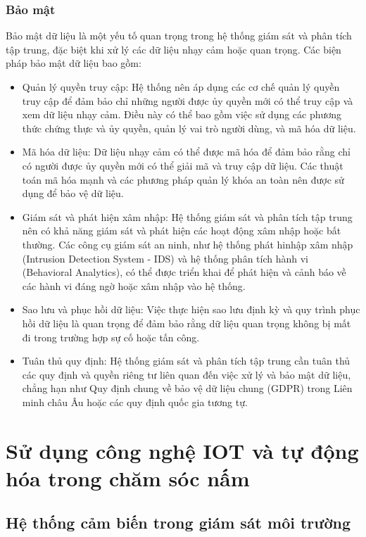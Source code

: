 \subsubsection{Bảo mật}
Bảo mật dữ liệu là một yếu tố quan trọng trong hệ thống giám sát và phân tích tập trung, đặc biệt khi xử lý các dữ liệu nhạy cảm hoặc quan trọng. Các biện pháp bảo mật dữ liệu bao gồm:
\begin{itemize}
    \item Quản lý quyền truy cập: Hệ thống nên áp dụng các cơ chế quản lý quyền truy cập để đảm bảo chỉ những người được ủy quyền mới có thể truy cập và xem dữ liệu nhạy cảm. Điều này có thể bao gồm việc sử dụng các phương thức chứng thực và ủy quyền, quản lý vai trò người dùng, và mã hóa dữ liệu.
    \item Mã hóa dữ liệu: Dữ liệu nhạy cảm có thể được mã hóa để đảm bảo rằng chỉ có người được ủy quyền mới có thể giải mã và truy cập dữ liệu. Các thuật toán mã hóa mạnh và các phương pháp quản lý khóa an toàn nên được sử dụng để bảo vệ dữ liệu.
    \item Giám sát và phát hiện xâm nhập: Hệ thống giám sát và phân tích tập trung nên có khả năng giám sát và phát hiện các hoạt động xâm nhập hoặc bất thường. Các công cụ giám sát an ninh, như hệ thống phát hinhập xâm nhập (Intrusion Detection System - IDS) và hệ thống phân tích hành vi (Behavioral Analytics), có thể được triển khai để phát hiện và cảnh báo về các hành vi đáng ngờ hoặc xâm nhập vào hệ thống.
    \item Sao lưu và phục hồi dữ liệu: Việc thực hiện sao lưu định kỳ và quy trình phục hồi dữ liệu là quan trọng để đảm bảo rằng dữ liệu quan trọng không bị mất đi trong trường hợp sự cố hoặc tấn công.
    \item Tuân thủ quy định: Hệ thống giám sát và phân tích tập trung cần tuân thủ các quy định và quyền riêng tư liên quan đến việc xử lý và bảo mật dữ liệu, chẳng hạn như Quy định chung về bảo vệ dữ liệu chung (GDPR) trong Liên minh châu Âu hoặc các quy định quốc gia tương tự.
\end{itemize}

\section{Sử dụng công nghệ IOT và tự động hóa trong chăm sóc nấm}

\subsection{Hệ thống cảm biến trong giám sát môi trường}

